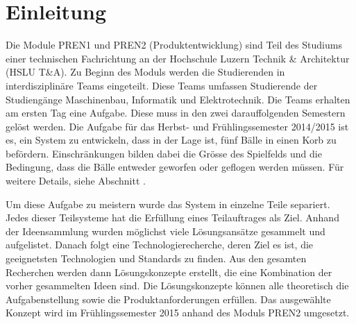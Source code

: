 \section{Einleitung}
Die Module PREN1 und PREN2 (Produktentwicklung) sind Teil des Studiums einer 
technischen Fachrichtung an der Hochschule Luzern Technik \& Architektur 
(HSLU T\&A). 
Zu Beginn des Moduls werden die Studierenden in interdisziplinäre Teams 
eingeteilt. Diese Teams umfassen Studierende der Studiengänge Maschinenbau, 
Informatik und Elektrotechnik. Die Teams erhalten am ersten Tag eine Aufgabe. 
Diese muss in den zwei darauffolgenden Semestern gelöst werden. 
Die Aufgabe für das Herbst- und Frühlingssemester 2014/2015 ist es, ein System zu entwickeln, dass in der Lage ist, fünf Bälle in einen Korb zu befördern. Einschränkungen bilden dabei die Grösse des Spielfelds und die Bedingung, dass die Bälle entweder geworfen oder geflogen werden müssen. 
Für weitere Details, siehe Abschnitt . 

Um diese Aufgabe zu meistern wurde das System in einzelne Teile separiert. Jedes dieser Teilsysteme hat die Erfüllung eines Teilauftrages als Ziel. Anhand der Ideensammlung wurden möglichst viele Lösungsansätze gesammelt und aufgelistet. Danach folgt eine Technologierecherche, deren Ziel es ist, die geeignetsten Technologien und Standards zu finden. Aus den gesamten Recherchen werden dann Lösungskonzepte erstellt, die eine Kombination der vorher gesammelten Ideen sind. Die Lösungskonzepte können alle theoretisch die Aufgabenstellung sowie die Produktanforderungen erfüllen. Das ausgewählte Konzept wird im Frühlingssemester 2015 anhand des Moduls PREN2 umgesetzt.